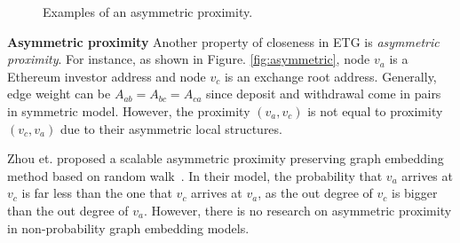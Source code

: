 \begin{figure}[htbp]
	\centering
	\caption{Examples of an asymmetric proximity.}

\end{figure}

\textbf{Asymmetric proximity}
Another property of closeness in ETG is \emph{asymmetric proximity}. For instance, as shown in Figure. \ref{fig:asymmetric}, node $v_a$ is a Ethereum investor address and node $v_c$ is an exchange root address. Generally, edge weight can be $A_{ab}=A_{bc}=A_{ca}$ since deposit and withdrawal come in pairs in symmetric model. However, the proximity $(v_a,v_c)$ is not equal to proximity $(v_c,v_a)$ due to their asymmetric local structures.

 Zhou et. proposed a scalable asymmetric proximity preserving graph embedding method based on random walk~\cite{zhou2017scalable}. In their model, the probability that $v_a$ arrives at $v_c$ is far less than the one that $v_c$ arrives at $v_a$, as the out degree of $v_c$ is bigger than the out degree of $v_a$.
However, there is no research on asymmetric proximity in non-probability graph embedding models.















